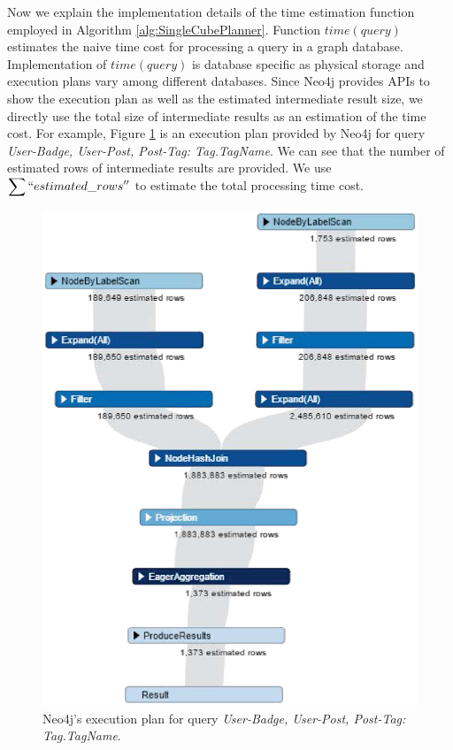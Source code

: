 	Now we explain the implementation details of the time estimation function employed in Algorithm \ref{alg:SingleCubePlanner}.
	Function \textbf{$time(query)$} estimates the naive time cost for processing a query in a graph database. Implementation of $time(query)$ is database specific as physical storage and execution plans vary among different databases. Since Neo4j provides APIs to show the execution plan as well as the estimated intermediate result size, we directly use the total size of intermediate results as an estimation of the time cost. For example, Figure \ref{fig:4:2} is an execution plan provided by Neo4j for query \textit{User-Badge, User-Post, Post-Tag: Tag.TagName}. We can see that the number of estimated rows of intermediate results are provided. We use $\displaystyle{\sum ``estimated\_rows''}$ to estimate the total processing time cost.
	
	\begin {figure}[h]
	\centering
	\includegraphics[scale=0.6]{pic/61.eps}
	\caption{Neo4j's execution plan for query \textit{User-Badge, User-Post, Post-Tag: Tag.TagName}.}
	\label{fig:4:2}
\end{figure}


